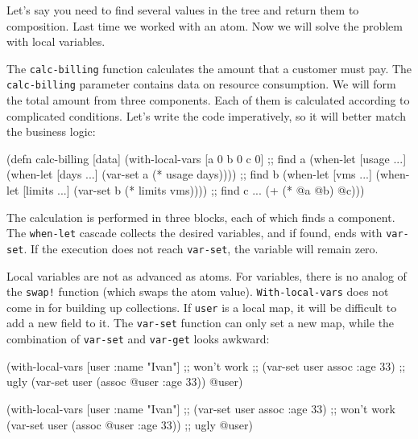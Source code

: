 Let's say you need to find several values in the tree and return them to composition.
Last time we worked with an atom. Now we will solve the problem with local variables.

The \verb|calc-billing| function calculates the amount that a customer must pay.
The \verb|calc-billing| parameter contains data on resource consumption. We will form the total amount from three components. Each of them is calculated according to complicated conditions. Let's write the code imperatively, so it will better match the business logic:

\begin{english}
  \begin{clojure}
(defn calc-billing [data]
  (with-local-vars
    [a 0 b 0 c 0]
    ;; find a
    (when-let [usage ...]
      (when-let [days ...]
        (var-set a (* usage days))))
    ;; find b
    (when-let [vms ...]
      (when-let [limits ...]
        (var-set b (* limits vms))))
    ;; find c ...
    (+ (* @a @b) @c)))
  \end{clojure}
\end{english}

The calculation is performed in three blocks, each of which finds a component.
The \verb|when-let| cascade collects the desired variables, and if found, ends with \verb|var-set|.
If the execution does not reach \verb|var-set|, the variable will remain zero.

Local variables are not as advanced as atoms.
For variables, there is no analog of the \verb|swap!| function (which swaps the atom value).
\verb|With-local-vars| does not come in for building up collections.
If \verb|user| is a local map, it will be difficult to add a new field to it.
The \verb|var-set| function can only set a new map, while the combination of \verb|var-set| and \verb|var-get| looks awkward:

\ifx\DEVICETYPE\MOBILE

\begin{english}
  \begin{clojure}
(with-local-vars [user {:name "Ivan"}]
  ;; won't work
  ;; (var-set user assoc :age 33)
  ;; ugly
  (var-set user (assoc @user :age 33))
  @user)
  \end{clojure}
\end{english}

\else

\begin{english}
  \begin{clojure}
(with-local-vars [user {:name "Ivan"}]
  ;; (var-set user assoc :age 33) ;; won't work
  (var-set user (assoc @user :age 33)) ;; ugly
  @user)
  \end{clojure}
\end{english}

